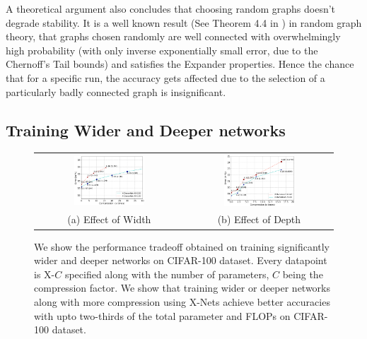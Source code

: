 \noindent A theoretical argument also concludes that choosing random graphs doesn't degrade stability. It is a well known result (See Theorem 4.4 in  \cite{salil2012pseudo}) in random graph theory, that graphs chosen randomly are well connected with overwhelmingly high probability (with only inverse exponentially small error, due to the Chernoff's Tail bounds) and satisfies the Expander properties. Hence the chance that for a specific run, the accuracy gets affected due to the selection of a particularly badly connected graph is insignificant.

\subsection{Training Wider and Deeper  networks}\label{sec:ultrawide}

\begin{figure}[t]
\begin{tabular}{cc}

\includegraphics[width=0.5\textwidth]{figures/ultrawide.png}  & 
\includegraphics[width=0.5\textwidth] {figures/ultradeep.png}\\
(a) Effect of Width  & (b) Effect of Depth \\
\end{tabular}
\caption{We show the performance tradeoff obtained on training significantly wider and deeper networks on CIFAR-100 dataset. Every datapoint is X-$C$ specified along with the number of parameters, $C$ being the compression factor. We show that training wider or deeper networks along with more  compression using X-Nets achieve better accuracies with upto two-thirds of the total parameter and FLOPs on CIFAR-100 dataset. }
\label{fig:deepnet}
\end{figure}


